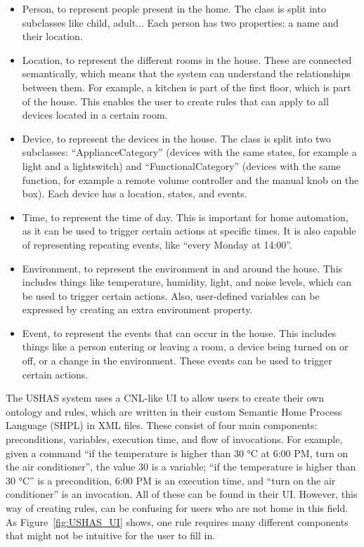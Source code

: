 \documentclass[11pt,a4paper]{report}
\begin{document}
\begin{itemize} 
    \item Person, to represent people present in the home. The class is split into subclasses like child, adult... Each person has two properties: a name and their location. 
    \item Location, to represent the different rooms in the house. These are connected semantically, which means that the system can understand the relationships between them. For example, a kitchen is part of the first floor, which is part of the house. This enables the user to create rules that can apply to all devices located in a certain room. 
    \item Device, to represent the devices in the house. The class is split into two subclasses: ``ApplianceCategory'' (devices with the same states, for example a light and a lightswitch) and ``FunctionalCategory'' (devices with the same function, for example a remote volume controller and the manual knob on the box). Each device has a location, states, and events. 
    \item Time, to represent the time of day. This is important for home automation, as it can be used to trigger certain actions at specific times. It is also capable of representing repeating events, like ``every Monday at 14:00''. 
    \item Environment, to represent the environment in and around the house. This includes things like temperature, humidity, light, and noise levels, which can be used to trigger certain actions. Also, user-defined variables can be expressed by creating an extra environment property. 
    \item Event, to represent the events that can occur in the house. This includes things like a person entering or leaving a room, a device being turned on or off, or a change in the environment. These events can be used to trigger certain actions. 
\end{itemize}

The USHAS system uses a CNL-like UI to allow users to create their own ontology and rules, which are written in their custom Semantic Home Process Language (SHPL) in XML files. These consist of four main components: preconditions, variables, execution time, and flow of invocations. For example, given a command ``if the temperature is higher than 30 °C at 6:00 PM, turn on the air conditioner'', the value 30 is a variable; ``if the temperature is higher than 30 °C'' is a precondition, 6:00 PM is an execution time, and ``turn on the air conditioner'' is an invocation. All of these can be found in their UI. However, this way of creating rules, can be confusing for users who are not home in this field. As Figure~\ref{fig:USHAS_UI} shows, one rule requires many different components that might not be intuitive for the user to fill in.
\end{document}
